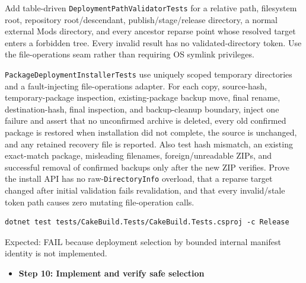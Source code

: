 \documentclass[
  10pt,
  letterpaper,
]{article}
\newcommand{\passthrough}[1]{#1}
\providecommand{\tightlist}{%
  \setlength{\itemsep}{0pt}\setlength{\parskip}{0pt}}
\begin{document}
Add table-driven \texttt{DeploymentPathValidatorTests} for a relative
path, filesystem root, repository root/descendant,
publish/\allowbreak{}stage/\allowbreak{}release directory, a normal
external Mods directory, and every ancestor reparse point whose resolved
target enters a forbidden tree. Every invalid result has no
validated-directory token. Use the file-operations seam rather than
requiring OS symlink privileges.

\texttt{PackageDeploymentInstallerTests} use uniquely scoped temporary
directories and a fault-injecting file-operations adapter. For each
copy, source-hash, temporary-package inspection, existing-package backup
move, final rename, destination-hash, final inspection, and
backup-cleanup boundary, inject one failure and assert that no
unconfirmed archive is deleted, every old confirmed package is restored
when installation did not complete, the source is unchanged, and any
retained recovery file is reported. Also test hash mismatch, an existing
exact-match package, misleading filenames, foreign/unreadable ZIPs, and
successful removal of confirmed backups only after the new ZIP verifies.
Prove the install API has no raw-\passthrough{\lstinline!DirectoryInfo!}
overload, that a reparse target changed after initial validation fails
revalidation, and that every invalid/stale token path causes zero
mutating file-operation calls.

\begin{lstlisting}
dotnet test tests/CakeBuild.Tests/CakeBuild.Tests.csproj -c Release
\end{lstlisting}

Expected: FAIL because deployment selection by bounded internal manifest
identity is not implemented.

\begin{itemize}
\tightlist
\item[$\square$]
  \textbf{Step 10: Implement and verify safe selection}
\end{itemize}
\end{document}
